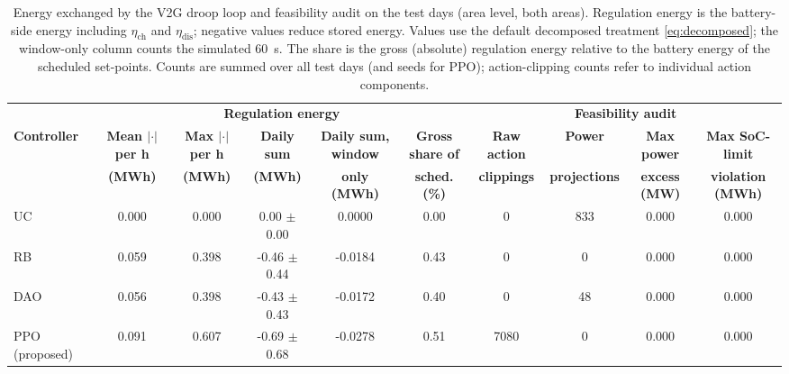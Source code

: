 \begin{table}[!t]
\caption{Energy exchanged by the V2G droop loop and feasibility audit on the test days (area level, both areas). Regulation energy is the battery-side energy including $\eta_{\mathrm{ch}}$ and $\eta_{\mathrm{dis}}$; negative values reduce stored energy. Values use the default decomposed treatment \eqref{eq:decomposed}; the window-only column counts the simulated 60~s. The share is the gross (absolute) regulation energy relative to the battery energy of the scheduled set-points. Counts are summed over all test days (and seeds for PPO); action-clipping counts refer to individual action components.}
\label{tab:regenergy}
\centering
\scriptsize
\setlength{\tabcolsep}{2.5pt}
\begin{tabular}{lccccccccc}
\toprule
& \multicolumn{5}{c}{\textbf{Regulation energy}} & \multicolumn{4}{c}{\textbf{Feasibility audit}}\\
\cmidrule(lr){2-6}\cmidrule(lr){7-10}
\textbf{Controller} & \textbf{Mean $|\cdot|$ per h} & \textbf{Max $|\cdot|$ per h} & \textbf{Daily sum} & \textbf{Daily sum, window} & \textbf{Gross share of} & \textbf{Raw action} & \textbf{Power} & \textbf{Max power} & \textbf{Max SoC-limit}\\
 & \textbf{(MWh)} & \textbf{(MWh)} & \textbf{(MWh)} & \textbf{only (MWh)} & \textbf{sched. (\%)} & \textbf{clippings} & \textbf{projections} & \textbf{excess (MW)} & \textbf{violation (MWh)}\\
\midrule
UC & 0.000 & 0.000 & 0.00 $\pm$ 0.00 & 0.0000 & 0.00 & 0 & 833 & 0.000 & 0.000 \\
RB & 0.059 & 0.398 & -0.46 $\pm$ 0.44 & -0.0184 & 0.43 & 0 & 0 & 0.000 & 0.000 \\
DAO & 0.056 & 0.398 & -0.43 $\pm$ 0.43 & -0.0172 & 0.40 & 0 & 48 & 0.000 & 0.000 \\
PPO (proposed) & 0.091 & 0.607 & -0.69 $\pm$ 0.68 & -0.0278 & 0.51 & 7080 & 0 & 0.000 & 0.000 \\
\bottomrule
\end{tabular}
\end{table}
